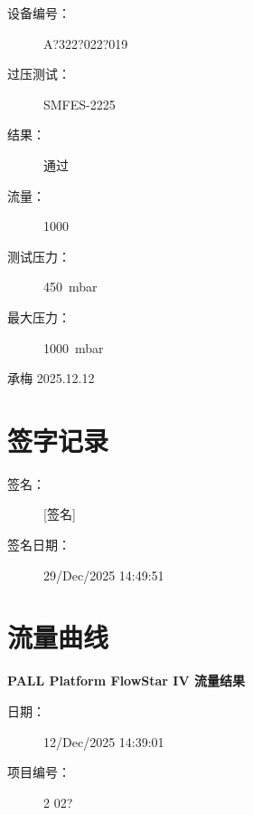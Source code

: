 \documentclass[UTF8,10pt,a4paper,fontset=fandol]{ctexart}
\newcommand{\fieldvalue}[1]{#1}
\newcommand{\handwritten}[1]{#1}
\begin{document}
\begin{description}
  \item[设备编号：]
  \fieldvalue{A?322?022?019}

  \item[过压测试：]
  \fieldvalue{SMFES-2225}

  \item[结果：]
  \fieldvalue{通过}

  \item[流量：]
  \fieldvalue{1000}

  \item[测试压力：]
  \fieldvalue{450~mbar}

  \item[最大压力：]
  \fieldvalue{1000~mbar}
\end{description}

\fieldvalue{\handwritten{承梅 2025.12.12}}

\section{签字记录}

\begin{description}
  \item[签名：]
  \fieldvalue{\handwritten{[签名]}}

  \item[签名日期：]
  \fieldvalue{29/Dec/2025 14:49:51}
\end{description}

\section{流量曲线}

\textbf{PALL Platform FlowStar IV 流量结果}

\begin{description}
  \item[日期：]
  \fieldvalue{12/Dec/2025 14:39:01}

  \item[项目编号：]
  \fieldvalue{2 02?}
\end{description}
\end{document}
